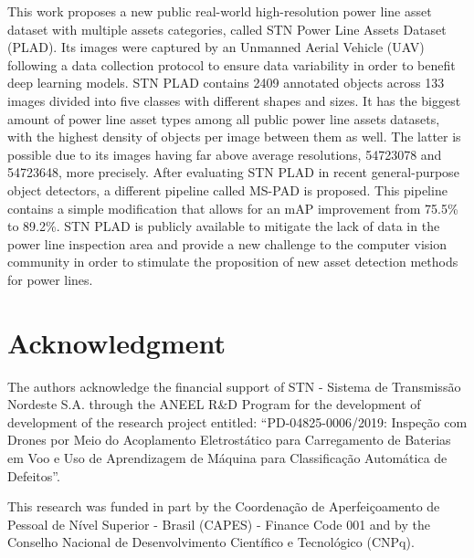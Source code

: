 \documentclass[10pt,conference]{IEEEtran}
\begin{document}
This work proposes a new public real-world high-resolution power line asset dataset with multiple assets categories, called STN Power Line Assets Dataset (PLAD). Its images were captured by an Unmanned Aerial Vehicle (UAV) following a data collection protocol to ensure data variability in order to benefit deep learning models. STN PLAD contains 2409 annotated objects across 133 images divided into five classes with different shapes and sizes. It has the biggest amount of power line asset types among all public power line assets datasets, with the highest density of objects per image between them as well. The latter is possible due to its images having far above average resolutions, 54723078 and 54723648, more precisely. After evaluating STN PLAD in recent general-purpose object detectors, a different pipeline called MS-PAD is proposed. This pipeline contains a simple modification that allows for an mAP improvement from 75.5\% to 89.2\%. STN PLAD is publicly available to mitigate the lack of data in the power line inspection area and provide a new challenge to the computer vision community in order to stimulate the proposition of new asset detection methods for power lines.




















\section*{Acknowledgment}
The authors acknowledge the financial support of STN - Sistema de Transmissão Nordeste S.A. through the ANEEL R\&D Program for the development of development of the research project entitled: “PD-04825-0006/2019: Inspeção com Drones por Meio do Acoplamento Eletrostático para Carregamento de Baterias em Voo e Uso de Aprendizagem de Máquina para Classificação Automática de Defeitos”. 

This research was funded in part by the Coordenação de Aperfeiçoamento de Pessoal de Nível Superior - Brasil (CAPES) - Finance Code 001 and by the Conselho Nacional de Desenvolvimento Científico e Tecnológico (CNPq).













\end{document}
